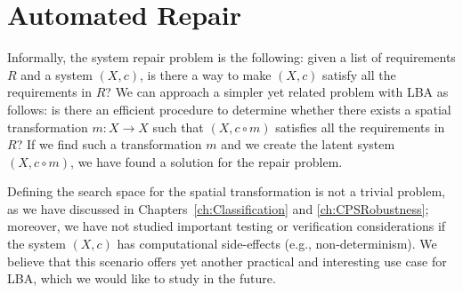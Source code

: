  
\section{Automated Repair}
Informally, the system repair problem is the following: given a list of requirements $R$ and a system $(X,c)$, is there a way to make $(X,c)$ satisfy all the requirements in $R$? We can approach a simpler yet related problem with LBA as follows: is there an efficient procedure to determine whether there exists a spatial transformation $m\colon X\rightarrow X$ such that $(X,c\circ m)$ satisfies all the requirements in $R$? If we find such a transformation $m$ and we create the latent system $(X,c\circ m)$, we have found a solution for the repair problem. 

Defining the search space for the spatial transformation is not a trivial problem, as we have discussed in Chapters~\ref{ch:Classification} and \ref{ch:CPSRobustness}; moreover, we have not studied important testing or verification considerations if the system $(X,c)$ has computational side-effects (e.g., non-determinism). We believe that this scenario offers yet another practical and interesting use case for LBA, which we would like to study in the future. %

